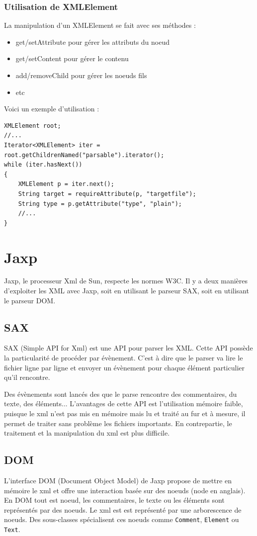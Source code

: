 \subsubsection{Utilisation de XMLElement}
La manipulation d'un XMLElement se fait avec ses méthodes :
\begin{itemize}
	\item get/setAttribute pour gérer les attributs du noeud
	\item get/setContent pour gérer le contenu
	\item add/removeChild pour gérer les noeuds fils
	\item etc
\end{itemize}
Voici un exemple d'utilisation :
\begin{lstlisting}
XMLElement root;
//...
Iterator<XMLElement> iter = root.getChildrenNamed("parsable").iterator();
while (iter.hasNext())
{
	XMLElement p = iter.next();
	String target = requireAttribute(p, "targetfile");
	String type = p.getAttribute("type", "plain");
	//...
}
\end{lstlisting}
\section{Jaxp}
Jaxp, le processeur Xml de Sun, respecte les normes W3C.
Il y a deux manières d'exploiter les XML avec Jaxp, soit en utilisant le parseur SAX, soit en utilisant le parseur DOM.
\subsection{SAX}
SAX (Simple API for Xml) est une API pour parser les XML.
Cette API possède la particularité de procéder par évènement.
C'est à dire que le parser va lire le fichier ligne par ligne et envoyer un évènement pour chaque élément particulier qu'il rencontre.

Des évènements sont lancés des que le parse rencontre des commentaires, du texte, des éléments...
L'avantages de cette API est l'utilisation mémoire faible, puisque le xml n'est pas mis en mémoire mais lu et traité au fur et à mesure, il permet de traiter sans problème les fichiers importants.
En contrepartie, le traitement et la manipulation du xml est plus difficile.
\subsection{DOM}
L'interface DOM (Document Object Model) de Jaxp propose de mettre en mémoire le xml et offre une interaction basée sur des noeuds (node en anglais).
En DOM tout est noeud, les commentaires, le texte ou les éléments sont représentés par des noeuds.
Le xml est est représenté par une arborescence de noeuds.
Des sous-classes spécialisent ces noeuds comme \verb|Comment|, \verb|Element| ou \verb|Text|.

